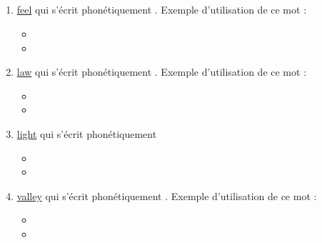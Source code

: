 \subsection{}\label{sec:l}

\begin{enumerate}
\item \href{http://www.wordreference.com/enfr/feel}{feel} qui s'écrit phonétiquement \href{https://en.oxforddictionaries.com/definition/feel}{}. Exemple d'utilisation de ce
  mot :
  
\begin{itemize}
\item{}
\item{}
  \end{itemize}
  
\item \href{http://www.wordreference.com/enfr/law}{law} qui s'écrit phonétiquement \href{https://en.oxforddictionaries.com/definition/law}{}. Exemple d'utilisation de ce
mot :

\begin{itemize}
\item{}
\item{}
\end{itemize}
  
\item \href{http://www.wordreference.com/enfr/light}{light} qui s'écrit phonétiquement \href{https://en.oxforddictionaries.com/definition/light}{}

\begin{itemize}
\item{}
\item{}
\end{itemize}

\item \href{http://www.wordreference.com/enfr/valley}{valley} qui s'écrit phonétiquement \href{https://en.oxforddictionaries.com/definition/valley}{}. Exemple d'utilisation de
ce mot :

\begin{itemize}
\item{}
\item{}
\end{itemize}

\end{enumerate}

